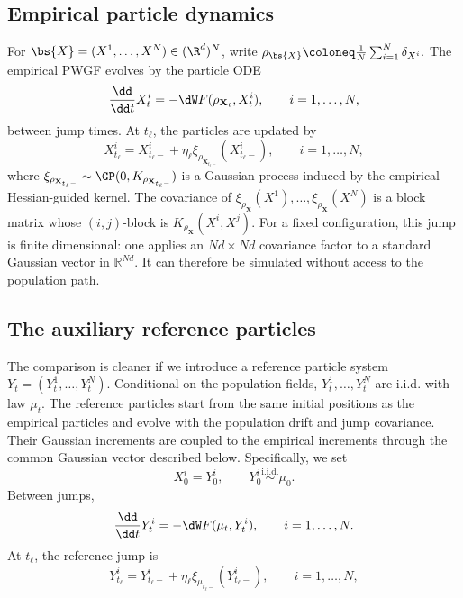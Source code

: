 \subsection{Empirical particle dynamics}
\label{subsec:particle-pwgf}

For \(\bs{X}=(X^1,\ldots,X^N)\in(\R^d)^N\), write $\rho_{\bs{X}}\coloneq \frac1N\sum_{i=1}^N \delta_{X^i}.$
The empirical PWGF evolves by the particle ODE
\begin{equation}
    \frac{\dd}{\dd t}X^i_t
    =
    -\dW F(\rho_{\mathbf X_t},X^i_t),
    \qquad i=1,\ldots,N,
    \label{eq:particle-flow}
\end{equation}
between jump times.  At \(t_\ell\), the particles are updated by
\begin{equation}
    X^i_{t_\ell}
    =
    X^i_{t_\ell-}+\eta_\ell\xi_{\rho_{\mathbf X_{t_\ell-}}}(X^i_{t_\ell-}),
    \qquad i=1,\ldots,N,
    \label{eq:particle-jump}
\end{equation}
where \(\xi_{\rho_{\mathbf X_{t_\ell-}}} \sim \GP(0,K_{\rho_{\mathbf X_{t_\ell-}}})\) is a Gaussian process induced by the empirical Hessian-guided kernel.  The covariance of \(\xi_{\rho_{\mathbf X}}(X^1),\ldots,\xi_{\rho_{\mathbf X}}(X^N)\) is
a block matrix whose \((i,j)\)-block is \(K_{\rho_{\mathbf X}}(X^i,X^j)\).
For a fixed configuration, this jump is finite dimensional: one applies an
\(Nd\times Nd\) covariance factor to a standard Gaussian vector in
\(\mathbb R^{Nd}\). It can therefore be simulated without access to the
population path.

\subsection{The auxiliary reference particles}
\label{subsec:auxiliary-particles}

The comparison is cleaner if we introduce a reference particle system
\(Y_t=(Y^1_t,\ldots,Y^N_t)\). Conditional on the population fields,
\(Y_t^1,\ldots,Y_t^N\) are i.i.d. with law \(\mu_t\). The reference particles
start from the same initial positions as the empirical particles and evolve
with the population drift and jump covariance. Their Gaussian increments are
coupled to the empirical increments through the common Gaussian vector
described below.
Specifically, we set
\begin{equation}
    X^i_0=Y^i_0,
    \qquad
    Y^i_0\stackrel{\mathrm{i.i.d.}}\sim \mu_0.
    \label{eq:same-initial-particles}
\end{equation}
Between jumps,
\begin{equation}
    \frac{\dd}{\dd t}Y^i_t
    =
    -\dW F(\mu_t,Y^i_t),
    \qquad i=1,\ldots,N.
    \label{eq:reference-flow}
\end{equation}
At \(t_\ell\), the reference jump is
\begin{equation}
    Y^i_{t_\ell}
    =
    Y^i_{t_\ell-}+\eta_\ell\xi_{\mu_{t_\ell-}}(Y^i_{t_\ell-}),
    \qquad i=1,\ldots,N,
    \label{eq:reference-jump}
\end{equation}


